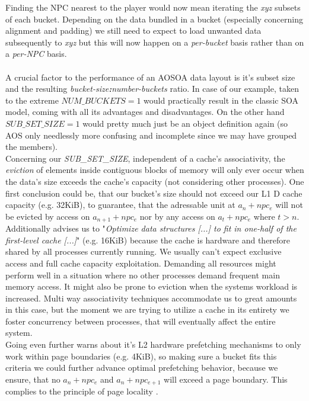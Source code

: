 Finding the NPC nearest to the player would now mean iterating the \textit{xyz} subsets of each bucket. Depending on the data bundled in a bucket (especially concerning alignment and padding) we still need to expect to load unwanted data subsequently to \textit{xyz} but this will now happen on a \textit{per-bucket} basis rather than on a \textit{per-NPC} basis.\\\\
A crucial factor to the performance of an AOSOA data layout is it's subset size and the resulting \textit{bucket-size\textbf{:}number-buckets} ratio. In case of our  example, taken to the extreme $\textit{NUM\_BUCKETS}=1$ would practically result in the classic SOA model, coming with all its advantages and disadvantages. On the other hand $\textit{SUB\_SET\_SIZE}=1$ would pretty much just be an object definition again (so AOS only needlessly more confusing and incomplete since we may have grouped the members).\\
Concerning our \textit{SUB\_SET\_SIZE}, independent of a cache's associativity, the \textit{eviction} of elements inside contiguous blocks of memory  will only ever occur when the data's size exceeds the cache's capacity (not considering other processes). One first conclusion could be, that our bucket's size should not exceed our L1 D cache capacity (e.g. 32KiB), to guarantee, that the adressable unit at $a_n + npc_e$ will not be evicted by access on $a_{n+1}+npc_e$ nor by any access on $a_t+npc_e$ where $t > n$.\\
Additionally  advises us to "\textit{Optimize data structures [...] to fit in one-half of the first-level cache [...]}" (e.g. 16KiB) because the cache is hardware and therefore shared by all processes currently running. We usually can't expect exclusive access and full cache capacity exploitation. Demanding all resources might perform well in a situation where no other processes demand frequent main memory access. It might also be prone to eviction when the systems workload is increased. Multi way associativity techniques accommodate us to great amounts in this case, but the moment we are trying to utilize a cache in its entirety we foster concurrency between processes, that will eventually affect the entire system.\\
Going even further  warns about it's L2 hardware prefetching mechanisms to only work within page boundaries (e.g. 4KiB), so making sure a bucket fits this criteria we could further advance optimal prefetching behavior, because we ensure, that no $a_n+npc_e$ and $a_n+npc_{e+1}$ will exceed a page boundary. This complies to the principle of page locality .\\
